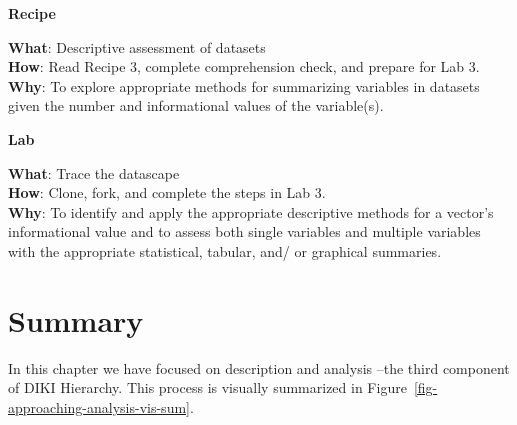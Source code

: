 \documentclass[
  letterpaper,
]{latex/krantz}
\theoremstyle{definition}
\theoremstyle{remark}
\begin{document}
\begin{tcolorbox}[enhanced jigsaw, breakable, leftrule=.75mm, arc=.35mm, colframe=quarto-callout-color-frame, colback=white, left=2mm, bottomrule=.15mm, rightrule=.15mm, toprule=.15mm, opacityback=0]

\textbf{ Recipe}

\textbf{What}: Descriptive assessment of datasets\\
\textbf{How}: Read Recipe 3, complete comprehension check, and prepare
for Lab 3.\\
\textbf{Why}: To explore appropriate methods for summarizing variables
in datasets given the number and informational values of the
variable(s).

\end{tcolorbox}

\begin{tcolorbox}[enhanced jigsaw, breakable, leftrule=.75mm, arc=.35mm, colframe=quarto-callout-color-frame, colback=white, left=2mm, bottomrule=.15mm, rightrule=.15mm, toprule=.15mm, opacityback=0]

\textbf{ Lab}

\textbf{What}: Trace the datascape\\
\textbf{How}: Clone, fork, and complete the steps in Lab 3.\\
\textbf{Why}: To identify and apply the appropriate descriptive methods
for a vector's informational value and to assess both single variables
and multiple variables with the appropriate statistical, tabular, and/
or graphical summaries.

\end{tcolorbox}

\section*{Summary}\label{summary-2}


In this chapter we have focused on description and analysis --the third
component of DIKI Hierarchy. This process is visually summarized in
Figure~\ref{fig-approaching-analysis-vis-sum}.
\end{document}
